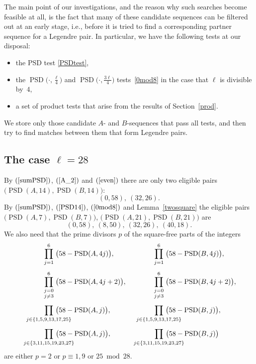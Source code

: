 \documentclass{article}
\theoremstyle{definition}
\newcommand{\PSD}{\operatorname{PSD}}
\begin{document}
The main point of our investigations, and the reason why such searches become feasible at all, is the fact that many of these candidate sequences can be filtered out at an early stage, i.e., before it is tried to find a corresponding partner sequence for a Legendre pair. In particular, we have the following tests at our disposal:
\begin{itemize}
    \item[(T1)] the PSD test \eqref{PSDtest},
    \item[(T2)] the $\PSD\bigl(\cdot,\frac{\ell}{4}\bigr)$ and $\PSD\bigl(\cdot,\frac{3\ell}{4}\bigr)$ tests~\eqref{0mod8} in the case that $\ell$ is divisible by~$4$,
    \item[(T3)] a set of product tests that arise from the results of Section~\ref{prod}.
\end{itemize}
We store only those candidate $A$- and $B$-sequences that pass all tests, and then try to find matches between them that form Legendre pairs.


\subsection{The case \texorpdfstring{$\ell=28$}{l=28}}

By  $(\ref{sumPSD})$, $(\ref{A_2})$ and $(\ref{even})$ there are only two eligible pairs $\bigl(\PSD(A,14),\PSD(B,14)\bigr)$:
$$(0,58),\ (32,26).$$
By $(\ref{sumPSD})$, $(\ref{PSD14})$, $(\ref{0mod8})$ and Lemma~\ref{twosquare} the eligible pairs $\bigl(\PSD(A,7),\PSD(B,7)\bigr)$, $\bigl(\PSD(A,21),\PSD(B,21)\bigr)$ are 
$$(0,58),\ (8,50),\ (32,26),\ (40,18).$$
We also need that the prime divisors $p$ of the square-free parts of the integers
\newcommand{\alprod}[1]{\prod_{\kern-30pt #1\kern-30pt}}
\begin{alignat*}{2}
  \kern30pt
  &  \alprod{j=1}^6\ \bigl(58-\PSD(A,4j)\bigr),
  && \alprod{j=1}^6\ \bigl(58-\PSD(B,4j)\bigr),
  \\[1ex]
  &  \alprod{\textstyle\genfrac{}{}{0pt}{}{j=0}{j\ne 3}}^6\ \bigl(58-\PSD(A,4j+2)\bigr),
  \kern30pt
  && \alprod{\textstyle\genfrac{}{}{0pt}{}{j=0}{j\ne 3}}^6\ \bigl(58-\PSD(B,4j+2)\bigr),
  \\[1ex]
  &  \alprod{j\in \{1,5,9,13,17,25\}}\ \bigl(58-\PSD(A,j)\bigr),
  && \alprod{j\in \{1,5,9,13,17,25\}}\ \bigl(58-\PSD(B,j)\bigr),
  \\[1ex]
  &  \alprod{j\in \{3,11,15,19,23,27\}}\ \bigl(58-\PSD(A,j)\bigr),
  && \alprod{j\in \{3,11,15,19,23,27\}}\ \bigl(58-\PSD(B,j)\bigr)
\end{alignat*}
are either $p=2$ or $p\equiv 1,9$ or $25\bmod 28$.
\end{document}
